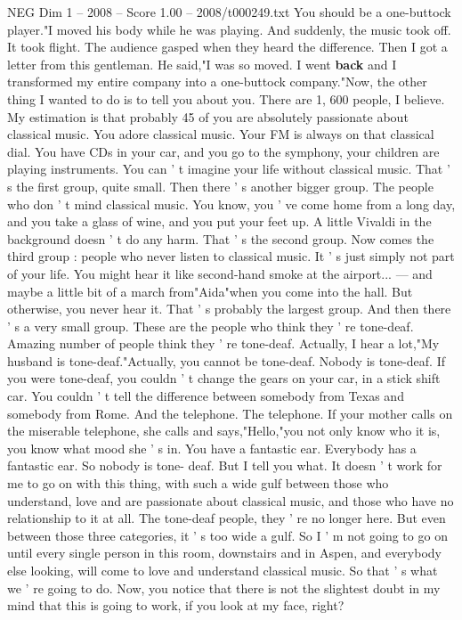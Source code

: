 \begin{textsample}{NEG Dim 1 – 2008 – Score 1.00 – 2008/t000249.txt}
You should be a one-buttock player."I moved his body while he was playing.
And suddenly, the music took off.
It took flight.
The audience gasped when they heard the difference.
Then I got a letter from this gentleman.
He said,"I was so moved.
I went \textbf{back} and I transformed my entire company into a one-buttock company."Now, the other thing I wanted to do is to tell you about you.
There are 1, 600 people, I believe.
My estimation is that probably 45 of you are absolutely passionate about classical music.
You adore classical music.
Your FM is always on that classical dial.
You have CDs in your car, and you go to the symphony, your children are playing instruments.
You can ' t imagine your life without classical music.
That ' s the first group, quite small.
Then there ' s another bigger group.
The people who don ' t mind classical music.
You know, you ' ve come home from a long day, and you take a glass of wine, and you put your feet up.
A little Vivaldi in the background doesn ' t do any harm.
That ' s the second group.
Now comes the third group : people who never listen to classical music.
It ' s just simply not part of your life.
You might hear it like second-hand smoke at the airport... — and maybe a little bit of a march from"Aida"when you come into the hall.
But otherwise, you never hear it.
That ' s probably the largest group.
And then there ' s a very small group.
These are the people who think they ' re tone-deaf.
Amazing number of people think they ' re tone-deaf.
Actually, I hear a lot,"My husband is tone-deaf."Actually, you cannot be tone-deaf.
Nobody is tone-deaf.
If you were tone-deaf, you couldn ' t change the gears on your car, in a stick shift car.
You couldn ' t tell the difference between somebody from Texas and somebody from Rome.
And the telephone.
The telephone.
If your mother calls on the miserable telephone, she calls and says,"Hello,"you not only know who it is, you know what mood she ' s in.
You have a fantastic ear.
Everybody has a fantastic ear.
So nobody is tone- deaf.
But I tell you what.
It doesn ' t work for me to go on with this thing, with such a wide gulf between those who understand, love and are passionate about classical music, and those who have no relationship to it at all.
The tone-deaf people, they ' re no longer here.
But even between those three categories, it ' s too wide a gulf.
So I ' m not going to go on until every single person in this room, downstairs and in Aspen, and everybody else looking, will come to love and understand classical music.
So that ' s what we ' re going to do.
Now, you notice that there is not the slightest doubt in my mind that this is going to work, if you look at my face, right?

\end{textsample}
